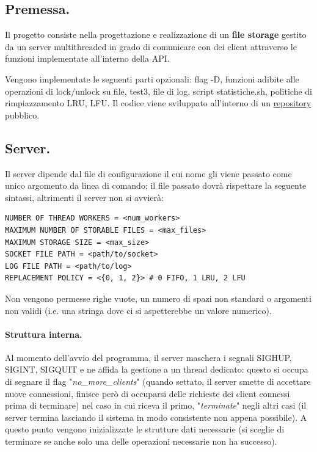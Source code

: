 \documentclass[11pt, italian, openany]{book}
\begin{document}
\begin{sloppypar}
\subsection{Premessa.}
Il progetto consiste nella progettazione e realizzazione di un \textbf{file storage} gestito da un server multithreaded in grado
di comunicare con dei client attraverso le funzioni implementate all'interno della API.

Vengono implementate le seguenti parti opzionali: flag -D, funzioni adibite alle operazioni di lock/unlock su file, test3,
file di log, script statistiche.sh, politiche di rimpiazzamento LRU, LFU. Il codice viene sviluppato all'interno di un
\href{https://github.com/liviusi/SOL-Progetto-20-21}{repository} pubblico.

\subsection{Server.}
Il server dipende dal file di configurazione il cui nome gli viene passato come unico argomento da linea di comando;
il file passato dovr\`a rispettare la seguente sintassi, altrimenti il server non si avvier\`a:
\begin{lstlisting}[style=code]
NUMBER OF THREAD WORKERS = <num_workers>
MAXIMUM NUMBER OF STORABLE FILES = <max_files>
MAXIMUM STORAGE SIZE = <max_size>
SOCKET FILE PATH = <path/to/socket>
LOG FILE PATH = <path/to/log>
REPLACEMENT POLICY = <{0, 1, 2}> # 0 FIFO, 1 LRU, 2 LFU
\end{lstlisting}
Non vengono permesse righe vuote, un numero di spazi non standard o argomenti non validi (i.e. una stringa dove ci si aspetterebbe
un valore numerico).

\paragraph*{Struttura interna.}
Al momento dell'avvio del programma, il server maschera i segnali SIGHUP, SIGINT, SIGQUIT e ne affida la gestione a un thread
dedicato: questo si occupa di segnare il flag "\textit{no\_more\_clients}" (quando settato, il server smette di accettare nuove
connessioni, finisce per\`o di occuparsi delle richieste dei client connessi prima di terminare) nel caso in cui riceva il primo,
"\textit{terminate}" negli altri casi (il server termina lasciando il sistema in modo consistente non appena possibile).
A questo punto vengono inizializzate le strutture dati necessarie (si sceglie di terminare se anche solo una delle operazioni
necessarie non ha successo).


\end{sloppypar}
\end{document}
